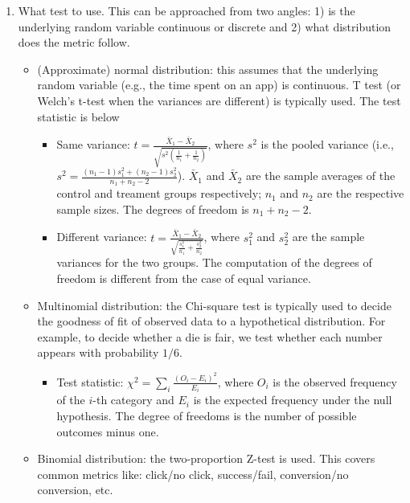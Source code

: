 \begin{enumerate}
                \item What test to use. This can be approached from two angles: 1) is the underlying random variable continuous or discrete and 2) what distribution does the metric follow.
                    \begin{itemize}
                        \item (Approximate) normal distribution: this assumes that the underlying random variable (e.g., the time spent on an app) is continuous. T test (or Welch's t-test when the variances are different) is typically used. The test statistic is below
                            \begin{itemize}
                                \item Same variance: $t = \frac{\bar{X}_1 - \bar{X}_2}{\sqrt{s^2(\frac{1}{n_1} + \frac{1}{n_2})}}$, where $s^2$ is the pooled variance (i.e., $s^2 = \frac{(n_1-1)s_1^2 + (n_2-1)s_2^2}{n_1 + n_2 - 2}$). $\bar{X}_1$ and $\bar{X}_2$ are the sample averages of the control and treament groups respectively; $n_1$ and $n_2$ are the respective sample sizes. The degrees of freedom is $n_1 + n_2 - 2$. 
                                \item Different variance: $t = \frac{\bar{X}_1 - \bar{X}_2}{\sqrt{\frac{s_1^2}{n_1} + \frac{s_2^2}{n_2}}}$, where $s_1^2$ and $s_2^2$ are the sample variances for the two groups. 
                                The computation of the degrees of freedom is different from the case of equal variance. 
                            \end{itemize}
                        \item Multinomial distribution: the Chi-square test is typically used to decide the goodness of fit of observed data to a hypothetical distribution. For example, to decide whether a die is fair, we test whether each number appears with probability $1/6$.
                            \begin{itemize}
                                \item Test statistic: $\chi^2 = \sum_{i}^{}{\frac{(O_i - E_i)^2}{E_i}}$, where $O_i$ is the observed frequency of the $i$-th category and $E_i$ is the expected frequency under the null hypothesis. The degree of freedoms is the number of possible outcomes minus one. 
                            \end{itemize}
                        \item Binomial distribution: the two-proportion Z-test is used. This covers common metrics like: click/no click, success/fail, conversion/no conversion, etc.

\end{itemize}
\end{enumerate}
